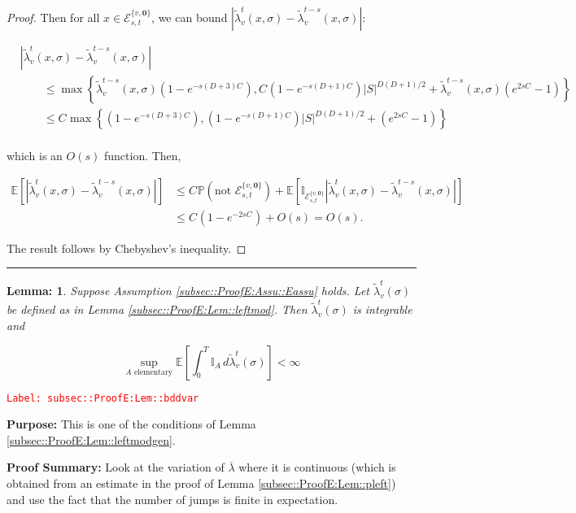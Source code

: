 \documentclass[12pt]{article}
\newcommand{\mb}{\mathbb}
\newcommand{\mc}{\mathcal}
\newcommand{\ov}{\overline}
\newcommand{\te}{\text}
\newcommand{\tr}{\textcolor{red}}
\newcommand{\labe}[1]{\tr{\texttt{Label: #1}}}
\newcommand{\purpose}{\textbf{Purpose: }}
\newcommand{\pfsum}{\textbf{Proof Summary: }}
\newcommand{\lin}{\rule{\linewidth}{0.4 pt}}
\newcommand{\pr}{\mb{P}}							%
\newcommand{\ex}[1]{\mb{E}\left[#1\right]}			%
\renewcommand{\root}{\mathbf{0}}				%
\renewcommand{\v}{v}							%
\renewcommand{\S}{S}							%
\newcommand{\s}{\sigma}							%
\newcommand{\T}{T}								%
\newcommand{\x}{x}								%
\renewcommand{\t}{t}							%
\renewcommand{\tt}{s}							%
\newcommand{\degr}{D}								%
\newcommand{\crate}[2]{\alt{\lambda}_{#1}^{#2}}		%
\newcommand{\const}[1]{C_{#1}}						%
\newcommand{\alt}{\widetilde}						%
\newcommand{\evnt}{\mc{E}}						%
\newcommand{\typset}{A}							%
\newtheorem{lem}[thms]{Lemma: }
\begin{document}
\begin{proof}
Then for all \(\x{}{} \in \evnt^{\{\v,\root\}}_{\tt,\t}\), we can bound \(|\crate{\v}{\t}(\x{}{},\s) - \crate{\v}{\t-\tt}(\x{}{},\s)|\):

\begin{align*}
&|\crate{\v}{\t}(\x{}{},\s) - \crate{\v}{\t-\tt}(\x{}{},\s)| \\
&\hspace{24pt}\leq \max\left\{\crate{\v}{\t-\tt}(\x{}{},\s)\left(1 - e^{-\tt(\degr+3)\const{}}\right),\const{}(1-e^{-\tt(\degr+1)\const{}})|\S|^{\degr(\degr+1)/2} + \crate{\v}{\t-\tt}(\x{}{},\s)\left(e^{2\tt\const{}} - 1\right)\right\}\\
&\hspace{24pt}\leq \const{}\max\left\{\left(1 - e^{-\tt(\degr+3)\const{}}\right),(1-e^{-\tt(\degr+1)\const{}})|\S|^{\degr(\degr+1)/2} + \left(e^{2\tt\const{}} - 1\right)\right\}\\
\end{align*}

which is an \(O(s)\) function. Then,

\begin{align*}
\ex{|\crate{\v}{\t}(\x{}{},\s) - \crate{\v}{\t-\tt}(\x{}{},\s)|} &\leq \const{}\pr\left(\te{not }\evnt^{\{\v,\root\}}_{\tt,\t}\right) + \ex{\mb{I}_{\evnt^{\{\v,\root\}}_{\tt,\t}}|\crate{\v}{\t}(\x{}{},\s) - \crate{\v}{\t-\tt}(\x{}{},\s)|}\\
&\leq \const{}(1 - e^{-2\tt\const{}}) + O(s) = O(s).
\end{align*}

The result follows by Chebyshev's inequality.
\end{proof}

\lin

\begin{lem}
Suppose Assumption \ref{subsec::ProofE:Assu::Eassu} holds. Let \(\crate{\v}{\t}(\s)\) be defined as in Lemma \ref{subsec::ProofE:Lem::leftmod}. Then \(\crate{\v}{\t}(\s)\) is integrable and 

\[\sup_{\typset\te{ elementary}} \ex{\int_0^\T \mb{I}_\typset\,d\crate{\v}{\t}(\s)} < \infty\]
\label{subsec::ProofE:Lem::bddvar}
\end{lem}
\labe{subsec::ProofE:Lem::bddvar}

\purpose This is one of the conditions of Lemma \ref{subsec::ProofE:Lem::leftmodgen}.

\pfsum Look at the variation of \(\ov{\lambda}\) where it is continuous (which is obtained from an estimate in the proof of Lemma \ref{subsec::ProofE:Lem::pleft}) and use the fact that the number of jumps is finite in expectation.
\end{document}
